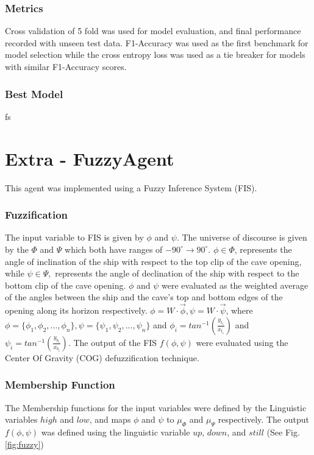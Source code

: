 \documentclass[10pt,journal,compsoc]{IEEEtran}
\begin{document}
\subsubsection*{Metrics}
Cross validation of 5 fold was used for model evaluation, and final performance recorded with unseen test
data. F1-Accuracy was used as the first benchmark for model selection while the cross entropy loss was 
used as a tie breaker for models with similar F1-Accuracy scores. 

\subsubsection*{Best Model}
fs

\section{Extra - FuzzyAgent}
This agent was implemented using a Fuzzy Inference System (FIS). 
\subsubsection*{Fuzzification}
The input variable to FIS is given by $\phi$ and $\psi$. The universe of discourse is given by the  
$\Phi$ and $\Psi$ which both have ranges of
$-90^{\circ} \to 90^{\circ}$. $\phi \in \Phi$, represents the angle of inclination of the ship with respect to the top clip of the cave
opening, while $\psi \in \Psi,$ represents the angle of declination of the ship with respect to the bottom clip
of the cave opening. $\phi$ and $\psi$ were evaluated as the weighted average of the angles between
the ship and the cave's top and bottom edges of the opening along its horizon respectively. $\phi = W \cdot \vec{\phi}, 
\psi = W \cdot \vec{\psi}$, where $\phi = \{\phi_1, \phi_2, ..., \phi_n\}, \psi = \{\psi_1, \psi_2, ..., 
\psi_n\}$ and $\phi_i = tan^{-1} \left(  \frac{y_{t_i}}{x_{t_i}}\right)$ and $\psi_i= tan^{-1} \left(  
\frac{y_{b_i}}{x_{b_i}}\right)$. 
The output of the FIS $f(\phi, \psi)$ were evaluated using the Center Of Gravity (COG) defuzzification 
technique.
\subsubsection*{Membership Function} 
The Membership functions for the input variables were defined by the Linguistic variables $high$ and $low$, and maps $\phi$ and $\psi$ to 
$\mu_{\Phi}$ and $\mu_{\Psi}$ respectively. The output $f(\phi, \psi)$ was defined using the linguistic variable
$up$, $down$, and $still$ (See Fig.\ref{fig:fuzzy})
\end{document}
